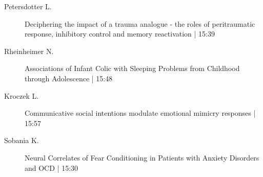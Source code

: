 \begin{symposium}
\begin{description}
                \item [ Petersdotter L.] Deciphering the impact of a trauma analogue - the roles of peritraumatic response, inhibitory control and memory reactivation \textcolor{mygray}{ | 15:39}    
                
                \item [ Rheinheimer N.] Associations of Infant Colic with Sleeping Problems from Childhood through Adolescence \textcolor{mygray}{ | 15:48}    
                
                \item [ Kroczek L.] Communicative social intentions modulate emotional mimicry responses \textcolor{mygray}{ | 15:57}    
                
                \item [ Sobania K.] Neural Correlates of Fear Conditioning in Patients with Anxiety Disorders and OCD \textcolor{mygray}{ | 15:30}    
                
            \end{description} 
            \end{symposium}
            